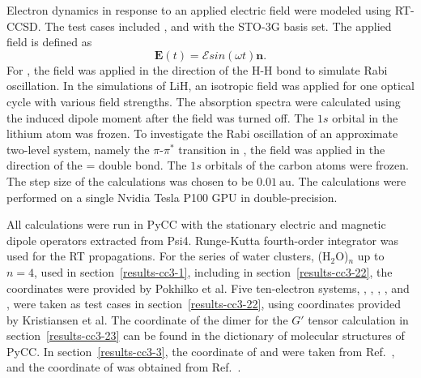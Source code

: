 Electron dynamics in response to an applied electric field were modeled using RT-CCSD. The test cases included ,  and  with the STO-3G basis set.\cite{Pietro1983} The applied field is defined as
\begin{equation}
\textbf{E}(t) = \mathcal{E}sin(\omega t)\textbf{n}.
\end{equation}
For , the field was applied in the direction of the H-H bond to simulate Rabi oscillation. In the simulations of LiH, an isotropic field was applied for one optical cycle with various field strengths. The absorption spectra were calculated using the induced dipole moment after the field was turned off. The $1s$ orbital in the lithium atom was frozen. To investigate the Rabi oscillation of an approximate two-level system, namely the $\pi$-$\pi^{*}$ transition in , the field was applied in the direction of the = double bond. The $1s$ orbitals of the carbon atoms were frozen. The step size of the calculations was chosen to be $0.01\ \text{au}$. The calculations were performed on a single Nvidia Tesla P100 GPU in double-precision.

All calculations were run in PyCC\cite{pycc} with the stationary electric and magnetic dipole operators extracted from Psi4. Runge-Kutta fourth-order integrator\cite{Butcher1996} was used for the RT propagations. For the series of water clusters, (H$_2$O)$_n$ up to $n=4$, used in section~\ref{results-cc3-1}, including  in section~\ref{results-cc3-22}, the coordinates were provided by Pokhilko et al.\cite{Pokhilko2018} Five ten-electron systems, , , , , and , were taken as test cases in section~\ref{results-cc3-22}, using coordinates provided by Kristiansen et al.\cite{Kristiansen2022} The coordinate of the  dimer for the $G'$ tensor calculation in section~\ref{results-cc3-23} can be found in the dictionary of molecular structures of PyCC. In section~\ref{results-cc3-3}, the coordinate of  and  were taken from Ref.~, and the coordinate of  was obtained from Ref.~.

